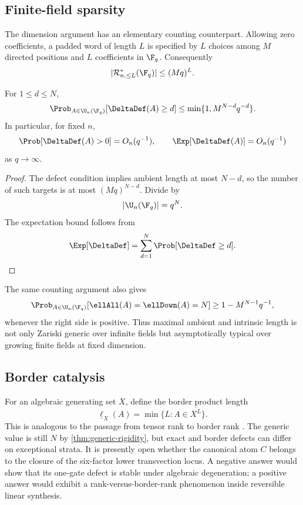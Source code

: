 \subsection{Finite-field sparsity}

The dimension argument has an elementary counting counterpart.  Allowing zero coefficients, a padded word of length $L$ is specified by $L$ choices among $M$ directed positions and $L$ coefficients in $\F_q$.  Consequently
\[
|\mathcal R^*_{n,\le L}(\F_q)|\le(Mq)^L.
\]

\begin{corollary}\label{cor:finite-field-density}
For $1\le d\le N$,
\[
\Prob_{A\in\U_n(\F_q)}[\DeltaDef(A)\ge d]
\le
\min\{1,M^{N-d}q^{-d}\}.
\]
In particular, for fixed $n$,
\[
\Prob[\DeltaDef(A)>0]=O_n(q^{-1}),
\qquad
\Exp[\DeltaDef(A)]=O_n(q^{-1})
\]
as $q\to\infty$.
\end{corollary}

\begin{proof}
The defect condition implies ambient length at most $N-d$, so the number of such targets is at most $(Mq)^{N-d}$.  Divide by
\[
|\U_n(\F_q)|=q^N.
\]
The expectation bound follows from
\[
\Exp[\DeltaDef]=\sum_{d=1}^{N}\Prob[\DeltaDef\ge d].
\]
\end{proof}

The same counting argument also gives
\[
\Prob_{A\in\U_n(\F_q)}[\ellAll(A)=\ellDown(A)=N]
\ge
1-M^{N-1}q^{-1},
\]
whenever the right side is positive.  Thus maximal ambient and intrinsic length is not only Zariski generic over infinite fields but asymptotically typical over growing finite fields at fixed dimension.

\subsection{Border catalysis}

For an algebraic generating set $X$, define the border product length
\[
\underline\ell_X(A)
=
\min\{L:A\in\overline{X^L}\}.
\]
This is analogous to the passage from tensor rank to border rank \cite{Landsberg2012}.  The generic value is still $N$ by \cref{thm:generic-rigidity}, but exact and border defects can differ on exceptional strata.  It is presently open whether the canonical atom $C$ belongs to the closure of the six-factor lower transvection locus.  A negative answer would show that its one-gate defect is stable under algebraic degeneration; a positive answer would exhibit a rank-versus-border-rank phenomenon inside reversible linear synthesis.

